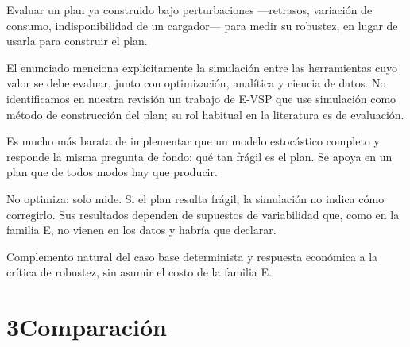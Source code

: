 \documentclass[11pt,a4paper,parskip=half]{scrartcl}
\begin{document}
\begin{campos}
\item[En qué consiste] Evaluar un plan ya construido bajo perturbaciones —retrasos, variación de consumo, indisponibilidad de un cargador— para medir su robustez, en lugar de usarla para construir el plan.
\item[Evidencia] El enunciado menciona explícitamente la simulación entre las herramientas cuyo valor se debe evaluar, junto con optimización, analítica y ciencia de datos. No identificamos en nuestra revisión un trabajo de E-VSP que use simulación como método de construcción del plan; su rol habitual en la literatura es de evaluación.
\item[Ventajas] Es mucho más barata de implementar que un modelo estocástico completo y responde la misma pregunta de fondo: qué tan frágil es el plan. Se apoya en un plan que de todos modos hay que producir.
\item[Desventajas] No optimiza: solo mide. Si el plan resulta frágil, la simulación no indica cómo corregirlo. Sus resultados dependen de supuestos de variabilidad que, como en la familia E, no vienen en los datos y habría que declarar.
\item[Aplicabilidad] Complemento natural del caso base determinista y respuesta económica a la crítica de robustez, sin asumir el costo de la familia E.
\end{campos}

\clearpage
\section*{3\quad Comparación}
\end{document}
